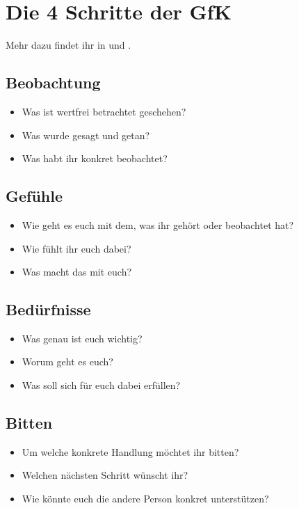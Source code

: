 \section{Die 4 Schritte der GfK}
\label{gfk-schritte}

Mehr dazu findet ihr in \cite[S.~213]{gfk-rosenberg} und \cite{gfk-dummies}.

\subsection{Beobachtung}

\begin{itemize}
    \item Was ist wertfrei betrachtet geschehen?
    \item Was wurde gesagt und getan?
    \item Was habt ihr konkret beobachtet?
\end{itemize}

\subsection{Gefühle}

\begin{itemize}
    \item Wie geht es euch mit dem, was ihr gehört oder beobachtet hat?
    \item Wie fühlt ihr euch dabei?
    \item Was macht das mit euch?
\end{itemize}

\subsection{Bedürfnisse}

\begin{itemize}
    \item Was genau ist euch wichtig?
    \item Worum geht es euch?
    \item Was soll sich für euch dabei erfüllen?
\end{itemize}

\subsection{Bitten}

\begin{itemize}
    \item Um welche konkrete Handlung möchtet ihr bitten?
    \item Welchen nächsten Schritt wünscht ihr?
    \item Wie könnte euch die andere Person konkret unterstützen?
\end{itemize}
